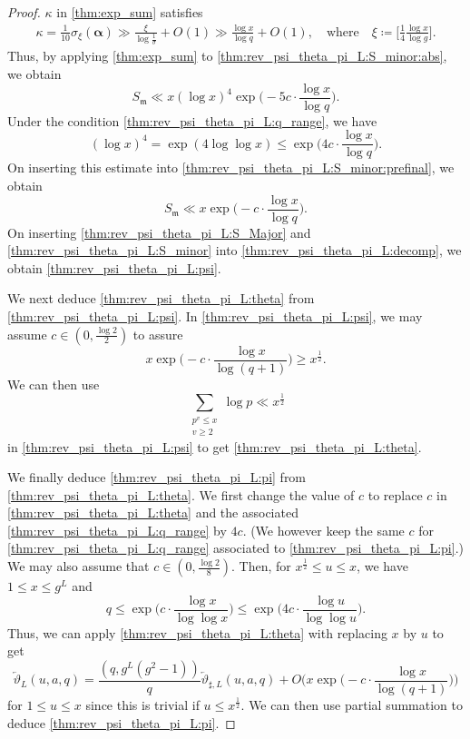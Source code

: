 \documentclass[hidelinks]{amsart}
\numberwithin{equation}{section}
\theoremstyle{plain}
\theoremstyle{definition}
\newcommand{\arev}{\overleftarrow}
\begin{document}
\begin{proof}
$\kappa$ in \cref{thm:exp_sum} satisfies
\begin{align}
\kappa
=
\frac{1}{10}\sigma_{\xi}(\bm{\alpha})
\gg
\frac{\xi}{\log\frac{1}{\sigma}}+O(1)
\gg
\frac{\log x}{\log q}+O(1),
\quad\text{where}\quad
\xi\coloneqq\biggl[\frac{1}{4}\frac{\log x}{\log g}\biggr].
\end{align}
Thus, by applying \cref{thm:exp_sum} to \cref{thm:rev_psi_theta_pi_L:S_minor:abs}, we obtain
\begin{equation}
\label{thm:rev_psi_theta_pi_L:S_minor:prefinal}
S_{\mathfrak{m}}
\ll
x(\log x)^{4}\exp\biggl(-5c\cdot\frac{\log x}{\log q}\biggr).
\end{equation}
Under the condition \cref{thm:rev_psi_theta_pi_L:q_range}, we have
\begin{equation}
\label{thm:rev_psi_theta_pi_L:log_bound}
(\log x)^{4}
=
\exp(4\log\log x)
\le
\exp\biggl(4c\cdot\frac{\log x}{\log q}\biggr).
\end{equation}
On inserting this estimate into \cref{thm:rev_psi_theta_pi_L:S_minor:prefinal}, we obtain
\begin{equation}
\label{thm:rev_psi_theta_pi_L:S_minor}
S_{\mathfrak{m}}
\ll
x\exp\biggl(-c\cdot\frac{\log x}{\log q}\biggr).
\end{equation}
On inserting \cref{thm:rev_psi_theta_pi_L:S_Major}
and \cref{thm:rev_psi_theta_pi_L:S_minor}
into \cref{thm:rev_psi_theta_pi_L:decomp}, we obtain \cref{thm:rev_psi_theta_pi_L:psi}.

We next deduce \cref{thm:rev_psi_theta_pi_L:theta} from \cref{thm:rev_psi_theta_pi_L:psi}.
In \cref{thm:rev_psi_theta_pi_L:psi}, we may assume $c\in(0,\frac{\log 2}{2})$ to assure
\[
x\exp\biggl(-c\cdot\frac{\log x}{\log(q+1)}\biggr)
\ge
x^{\frac{1}{2}}.
\]
We can then use
\[
\sum_{\substack{
p^{v}\le x\\
v\ge 2
}}
\log p
\ll
x^{\frac{1}{2}}
\]
in \cref{thm:rev_psi_theta_pi_L:psi} to get \cref{thm:rev_psi_theta_pi_L:theta}.

We finally deduce \cref{thm:rev_psi_theta_pi_L:pi} from \cref{thm:rev_psi_theta_pi_L:theta}.
We first change the value of $c$ to replace $c$ in \cref{thm:rev_psi_theta_pi_L:theta}
and the associated \cref{thm:rev_psi_theta_pi_L:q_range} by $4c$.
(We however keep the same $c$ for \cref{thm:rev_psi_theta_pi_L:q_range}
associated to \cref{thm:rev_psi_theta_pi_L:pi}.)
We may also assume that $c\in(0,\frac{\log 2}{8})$.
Then, for $x^{\frac{1}{2}}\le u\le x$, we have $1\le x\le g^{L}$ and
\[
q
\le
\exp\biggl(c\cdot\frac{\log x}{\log\log x}\biggr)
\le
\exp\biggl(4c\cdot\frac{\log u}{\log\log u}\biggr).
\]
Thus, we can apply \cref{thm:rev_psi_theta_pi_L:theta} with replacing $x$ by $u$ to get
\[
\arev{\vartheta}\!_{L}(u,a,q)
=
\frac{(q,g^{L}(g^{2}-1))}{q}
\arev{\vartheta}\!_{\sharp,L}(u,a,q)
+
O\biggl(x\exp\biggl(-c\cdot\frac{\log x}{\log(q+1)}\biggr)\biggr)
\]
for $1\le u\le x$ since this is trivial if $u\le x^{\frac{1}{2}}$.
We can then use partial summation to deduce \cref{thm:rev_psi_theta_pi_L:pi}.
\end{proof}
\end{document}
